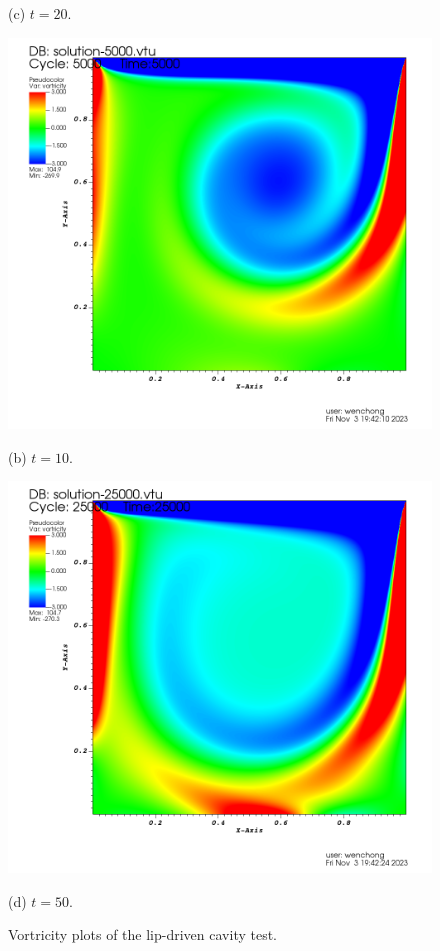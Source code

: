 \documentclass[lang=en,11pt,a4paper,bibend=bibtex]{elegantpaper}
\begin{document}
\begin{figure}[H]
\begin{minipage}[t]{0.45\linewidth}
        \caption*{(c) $t=20$.}
    \end{minipage}
    \begin{minipage}[t]{0.45\linewidth}
        \centering
        \includegraphics[width=0.9\linewidth]{png/lip-10.png}
        \caption*{(b) $t=10$.}
        \includegraphics[width=0.9\linewidth]{png/lip-50.png}
        \caption*{(d) $t=50$.}
    \end{minipage}
    \caption{Vortricity plots of the lip-driven cavity test.}
\end{figure}
\end{document}

